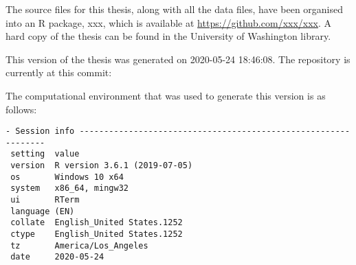 \documentclass [11pt, proquest] {uwthesis}[2015/03/03]
\begin{document}
The source files for this thesis, along with all the data files, have
been organised into an R package, xxx, which is available at
\url{https://github.com/xxx/xxx}. A hard copy of the thesis can be found
in the University of Washington library.

This version of the thesis was generated on 2020-05-24 18:46:08. The
repository is currently at this commit:

The computational environment that was used to generate this version is
as follows:
\begin{verbatim}
- Session info ---------------------------------------------------------------
 setting  value                       
 version  R version 3.6.1 (2019-07-05)
 os       Windows 10 x64              
 system   x86_64, mingw32             
 ui       RTerm                       
 language (EN)                        
 collate  English_United States.1252  
 ctype    English_United States.1252  
 tz       America/Los_Angeles         
 date     2020-05-24                  


\end{verbatim}
\end{document}
